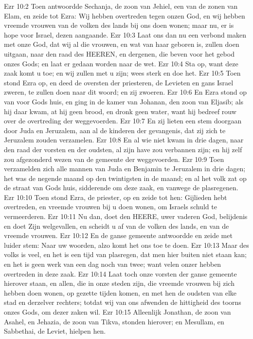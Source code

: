 Ezr 10:2  Toen antwoordde Sechanja, de zoon van Jehiel, een van de zonen van Elam, en zeide tot Ezra: Wij hebben overtreden tegen onzen God, en wij hebben vreemde vrouwen van de volken des lands bij ons doen wonen; maar nu, er is hope voor Israel, dezen aangaande.
Ezr 10:3  Laat ons dan nu een verbond maken met onze God, dat wij al die vrouwen, en wat van haar geboren is, zullen doen uitgaan, naar den raad des HEEREN, en dergenen, die beven voor het gebod onzes Gods; en laat er gedaan worden naar de wet.
Ezr 10:4  Sta op, want deze zaak komt u toe; en wij zullen met u zijn; wees sterk en doe het.
Ezr 10:5  Toen stond Ezra op, en deed de oversten der priesteren, de Levieten en gans Israel zweren, te zullen doen naar dit woord; en zij zwoeren.
Ezr 10:6  En Ezra stond op van voor Gods huis, en ging in de kamer van Johanan, den zoon van Eljasib; als hij daar kwam, at hij geen brood, en dronk geen water, want hij bedreef rouw over de overtreding der weggevoerden.
Ezr 10:7  En zij lieten een stem doorgaan door Juda en Jeruzalem, aan al de kinderen der gevangenis, dat zij zich te Jeruzalem zouden verzamelen.
Ezr 10:8  En al wie niet kwam in drie dagen, naar den raad der vorsten en der oudsten, al zijn have zou verbannen zijn; en hij zelf zou afgezonderd wezen van de gemeente der weggevoerden.
Ezr 10:9  Toen verzamelden zich alle mannen van Juda en Benjamin te Jeruzalem in drie dagen; het was de negende maand op den twintigsten in de maand; en al het volk zat op de straat van Gods huis, sidderende om deze zaak, en vanwege de plasregenen.
Ezr 10:10  Toen stond Ezra, de priester, op en zeide tot hen: Gijlieden hebt overtreden, en vreemde vrouwen bij u doen wonen, om Israels schuld te vermeerderen.
Ezr 10:11  Nu dan, doet den HEERE, uwer vaderen God, belijdenis en doet Zijn welgevallen, en scheidt u af van de volken des lands, en van de vreemde vrouwen.
Ezr 10:12  En de ganse gemeente antwoordde en zeide met luider stem: Naar uw woorden, alzo komt het ons toe te doen.
Ezr 10:13  Maar des volks is veel, en het is een tijd van plasregen, dat men hier buiten niet staan kan; en het is geen werk van een dag noch van twee; want velen onzer hebben overtreden in deze zaak.
Ezr 10:14  Laat toch onze vorsten der ganse gemeente hierover staan, en allen, die in onze steden zijn, die vreemde vrouwen bij zich hebben doen wonen, op gezette tijden komen, en met hen de oudsten van elke stad en derzelver rechters; totdat wij van ons afwenden de hittigheid des toorns onzes Gods, om dezer zaken wil.
Ezr 10:15  Alleenlijk Jonathan, de zoon van Asahel, en Jehazia, de zoon van Tikva, stonden hierover; en Mesullam, en Sabbethai, de Leviet, hielpen hen.
